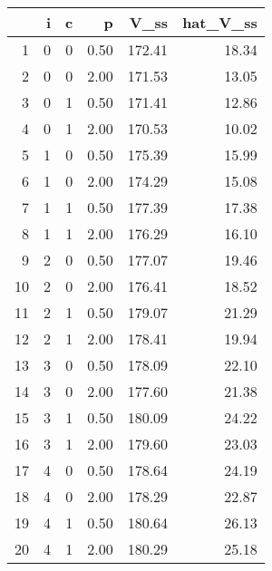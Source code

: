 \begin{tabular}{rrrrrr}
  \hline
 & i & c & p & V\_ss & hat\_V\_ss \\ 
  \hline
1 &   0 &   0 & 0.50 & 172.41 & 18.34 \\ 
  2 &   0 &   0 & 2.00 & 171.53 & 13.05 \\ 
  3 &   0 &   1 & 0.50 & 171.41 & 12.86 \\ 
  4 &   0 &   1 & 2.00 & 170.53 & 10.02 \\ 
  5 &   1 &   0 & 0.50 & 175.39 & 15.99 \\ 
  6 &   1 &   0 & 2.00 & 174.29 & 15.08 \\ 
  7 &   1 &   1 & 0.50 & 177.39 & 17.38 \\ 
  8 &   1 &   1 & 2.00 & 176.29 & 16.10 \\ 
  9 &   2 &   0 & 0.50 & 177.07 & 19.46 \\ 
  10 &   2 &   0 & 2.00 & 176.41 & 18.52 \\ 
  11 &   2 &   1 & 0.50 & 179.07 & 21.29 \\ 
  12 &   2 &   1 & 2.00 & 178.41 & 19.94 \\ 
  13 &   3 &   0 & 0.50 & 178.09 & 22.10 \\ 
  14 &   3 &   0 & 2.00 & 177.60 & 21.38 \\ 
  15 &   3 &   1 & 0.50 & 180.09 & 24.22 \\ 
  16 &   3 &   1 & 2.00 & 179.60 & 23.03 \\ 
  17 &   4 &   0 & 0.50 & 178.64 & 24.19 \\ 
  18 &   4 &   0 & 2.00 & 178.29 & 22.87 \\ 
  19 &   4 &   1 & 0.50 & 180.64 & 26.13 \\ 
  20 &   4 &   1 & 2.00 & 180.29 & 25.18 \\ 
   \hline
\end{tabular}

